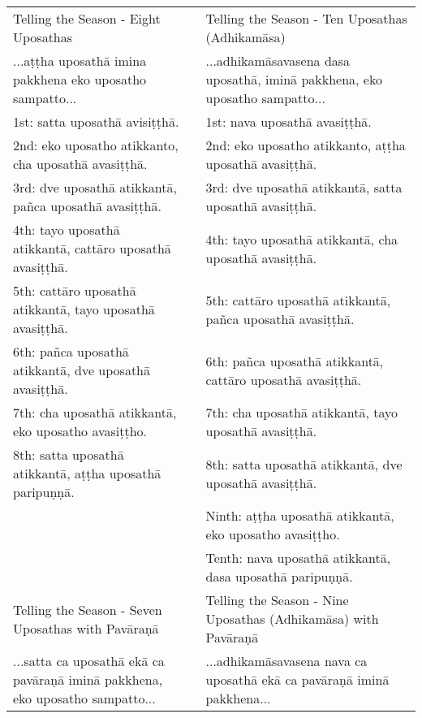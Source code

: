 \small
\begin{tabular}{p{}
				p{}
				p{}}
Telling the Season - Eight Uposathas & & Telling the Season - Ten Uposathas (Adhikamāsa)\\

...aṭṭha uposathā imina pakkhena eko uposatho sampatto...	 & 	 & 	...adhikamāsavasena dasa uposathā, iminā pakkhena, eko uposatho sampatto... \\

1st: satta uposathā avisiṭṭhā.	 & 	 & 	 1st: nava uposathā avasiṭṭhā.\\

2nd: eko uposatho atikkanto, cha uposathā avasiṭṭhā.	&	& 2nd: eko uposatho atikkanto, aṭṭha uposathā avasiṭṭhā.\\
3rd: dve uposathā atikkantā, pañca uposathā avasiṭṭhā.	 & 	 & 	 3rd: dve uposathā atikkantā, satta uposathā avasiṭṭhā.\\
4th: tayo uposathā atikkantā, cattāro uposathā avasiṭṭhā.	 & 	 & 	 4th: tayo uposathā atikkantā, cha uposathā avasiṭṭhā.\\
5th: cattāro uposathā atikkantā, tayo uposathā avasiṭṭhā.	 & 	 & 	 5th: cattāro uposathā atikkantā, pañca uposathā avasiṭṭhā.\\
6th: pañca uposathā atikkantā, dve uposathā avasiṭṭhā.	 & 	 & 	 6th: pañca uposathā atikkantā, cattāro uposathā avasiṭṭhā.\\
7th: cha uposathā atikkantā, eko uposatho avasiṭṭho.	 & 	 & 	 7th: cha uposathā atikkantā, tayo uposathā avasiṭṭhā.\\
8th: satta uposathā atikkantā, aṭṭha uposathā paripuṇṇā.	 & 	 & 	 8th: satta uposathā atikkantā, dve uposathā avasiṭṭhā.\\
															&	&	 Ninth: aṭṭha uposathā atikkantā, eko uposatho avasiṭṭho.\\
															&	& Tenth: nava uposathā atikkantā, dasa uposathā paripuṇṇā.\\

Telling the Season - Seven Uposathas with Pavāraṇā	 & 	 & 	 Telling the Season - Nine Uposathas (Adhikamāsa) with Pavāraṇā \\

...satta ca uposathā ekā ca pavāraṇā iminā pakkhena, eko uposatho sampatto...	 & 	 & 	 ...adhikamāsavasena nava ca uposathā ekā ca pavāraṇā iminā pakkhena...\\


\end{tabular}
